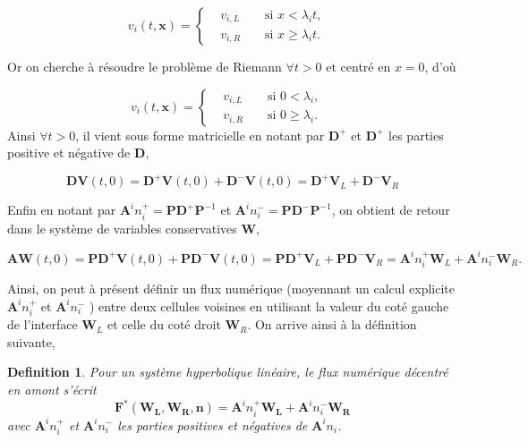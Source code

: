 \documentclass[a4paper,oneside,10pt]{report}
\newtheorem{mydef}{Definition}
\begin{document}
\begin{equation}
v_i(t,\mathbf{x}) = \left\{
\begin{aligned}
&v_{i,L}& &\mbox{ si } x < \lambda_it,&\\
&v_{i,R}& &\mbox{ si } x \geq \lambda_it.&
\end{aligned}
\right.
\end{equation}


Or on cherche à résoudre le problème de Riemann $\forall t > 0$ et  centré en $x=0$, d'où


\begin{equation}
v_i(t,\mathbf{x}) = \left\{
\begin{aligned}
&v_{i,L}& &\mbox{ si }  0 <\lambda_i,&\\
&v_{i,R}& &\mbox{ si } 0 \geq \lambda_i .&
\end{aligned}
\right.
\end{equation}
 Ainsi $\forall t > 0$, il vient sous forme matricielle en notant par $\mathbf{D}^+$ et $\mathbf{D}^+$ les parties positive et négative de $\mathbf{D}$,

\begin{equation}
\mathbf{D} \mathbf{V}(t,0) = \mathbf{D}^+\mathbf{V}(t,0) + \mathbf{D}^-\mathbf{V}(t,0)  =  \mathbf{D}^+\mathbf{V}_L  + \mathbf{D}^-\mathbf{V}_R 
\end{equation}
 
 Enfin en notant par $\mathbf{A}^in_i^+= \mathbf{P}\mathbf{D}^+\mathbf{P}^{-1}$ et  $\mathbf{A}^in_i^-= \mathbf{P}\mathbf{D}^-\mathbf{P}^{-1}$, on obtient de retour dans le système de variables conservatives $\mathbf{W}$,
 
 \begin{equation}
 \label{flux1}
\mathbf{A} \mathbf{W}(t,0) = \mathbf{P} \mathbf{D}^+\mathbf{V}(t,0) + \mathbf{P}\mathbf{D}^-\mathbf{V}(t,0)  =  \mathbf{P}\mathbf{D}^+\mathbf{V}_L  + \mathbf{P} \mathbf{D}^-\mathbf{V}_R = \mathbf{A}^in_i^+\mathbf{W}_L + \mathbf{A}^in_i^-\mathbf{W}_R.
\end{equation}
 
Ainsi, on peut à présent définir un flux numérique (moyennant un calcul explicite $\mathbf{A}^i n_i^+$ et $\mathbf{A}^i n_i^-$ ) entre deux cellules voisines en utilisant la valeur du coté gauche de l'interface $\mathbf{W}_L$ et celle du coté droit $\mathbf{W}_R$. On arrive ainsi à la définition suivante,
 
\begin{mydef}
Pour un système hyperbolique linéaire, le flux numérique décentré en amont s'écrit 
 \begin{equation}
 \mathbf{F}^*(\mathbf{W_L},\mathbf{W_R},\mathbf{n}) = \mathbf{A}^i n_i^+\mathbf{W_L} + \mathbf{A}^i n_i^-\mathbf{W_R}
 \end{equation}
 avec $\mathbf{A}^i n_i^+$ et $\mathbf{A}^i n_i^-$ les parties positives et négatives de $\mathbf{A}^i n_i$.
\end{mydef}
\end{document}
